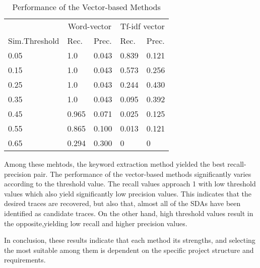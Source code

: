 \begin{table}[htb]
\centering
\caption{\label{tab:vecperf}Performance of the Vector-based Methods}
\begin{tabular}{lllll}
\toprule
  & \multicolumn{2}{c}{Word-vector} &  \multicolumn{2}{c}{Tf-idf vector} \\
  \cmidrule{2-5}
{Sim.Threshold   } & {Rec.} & {Prec.} &  {Rec.} & {Prec.}\\
\midrule
0.05    & 1.0 & 0.043 & 0.839 & 0.121 \\
0.15    & 1.0 & 0.043 & 0.573 & 0.256 \\
0.25    & 1.0 & 0.043 & 0.244 & 0.430 \\
0.35    & 1.0 & 0.043 & 0.095 & 0.392 \\
0.45    & 0.965 & 0.071 & 0.025 & 0.125 \\
0.55    & 0.865 & 0.100 & 0.013 & 0.121 \\
0.65    & 0.294 & 0.300 & 0 & 0 \\
\bottomrule
\end{tabular}
\end{table}

Among these mehtods,  the keyword extraction method yielded the best recall-precision pair.
The performance of the vector-based methods  significantly varies according to the threshold value.
The recall values  approach 1 with low  threshold values which also yield significantly low precision values.
 This indicates that the desired traces are recovered, but also that,  almost all of the SDAs have been identified as candidate traces.
 On the other hand, high threshold values result in the  opposite,yielding low recall and higher precision values.

In conclusion, these results indicate that each method its strengths, and selecting the most suitable among them is dependent  on the specific project structure and requirements. 


